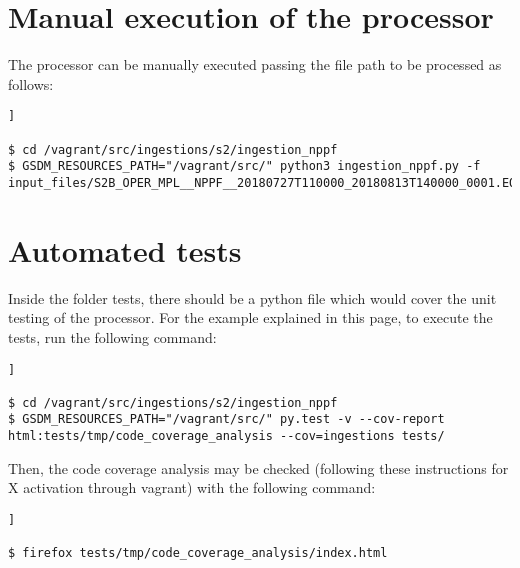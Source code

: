 \section{Manual execution of the processor}

The processor can be manually executed passing the file path to be processed as follows:

\begin{lstlisting}[breaklines=true, style=c]]

$ cd /vagrant/src/ingestions/s2/ingestion_nppf
$ GSDM_RESOURCES_PATH="/vagrant/src/" python3 ingestion_nppf.py -f input_files/S2B_OPER_MPL__NPPF__20180727T110000_20180813T140000_0001.EOF

\end{lstlisting}

\section{Automated tests}

Inside the folder tests, there should be a python file which would cover the unit testing of the processor. For the example explained in this page, to execute the tests, run the following command:

\begin{lstlisting}[breaklines=true, style=c]]

$ cd /vagrant/src/ingestions/s2/ingestion_nppf
$ GSDM_RESOURCES_PATH="/vagrant/src/" py.test -v --cov-report html:tests/tmp/code_coverage_analysis --cov=ingestions tests/

\end{lstlisting}

Then, the code coverage analysis may be checked (following these instructions for X activation through vagrant) with the following command:

\begin{lstlisting}[breaklines=true, style=c]]

$ firefox tests/tmp/code_coverage_analysis/index.html

\end{lstlisting}
